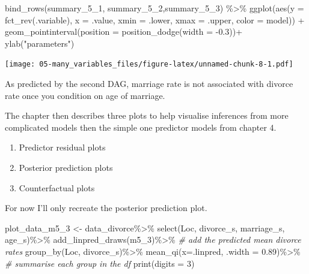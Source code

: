 \documentclass[
]{book}
\newenvironment{Shaded}{\begin{snugshade}}{\end{snugshade}}
\newcommand{\AttributeTok}[1]{\textcolor[rgb]{0.77,0.63,0.00}{#1}}
\newcommand{\CommentTok}[1]{\textcolor[rgb]{0.56,0.35,0.01}{\textit{#1}}}
\newcommand{\DecValTok}[1]{\textcolor[rgb]{0.00,0.00,0.81}{#1}}
\newcommand{\FloatTok}[1]{\textcolor[rgb]{0.00,0.00,0.81}{#1}}
\newcommand{\FunctionTok}[1]{\textcolor[rgb]{0.00,0.00,0.00}{#1}}
\newcommand{\NormalTok}[1]{#1}
\newcommand{\OtherTok}[1]{\textcolor[rgb]{0.56,0.35,0.01}{#1}}
\newcommand{\SpecialCharTok}[1]{\textcolor[rgb]{0.00,0.00,0.00}{#1}}
\newcommand{\StringTok}[1]{\textcolor[rgb]{0.31,0.60,0.02}{#1}}
\providecommand{\tightlist}{%
  \setlength{\itemsep}{0pt}\setlength{\parskip}{0pt}}
\begin{document}
\begin{Shaded}
\begin{Highlighting}[]
\FunctionTok{bind\_rows}\NormalTok{(summary\_5\_1, summary\_5\_2,summary\_5\_3) }\SpecialCharTok{\%\textgreater{}\%}
  \FunctionTok{ggplot}\NormalTok{(}\FunctionTok{aes}\NormalTok{(}\AttributeTok{y =} \FunctionTok{fct\_rev}\NormalTok{(.variable), }\AttributeTok{x =}\NormalTok{ .value, }\AttributeTok{xmin =}\NormalTok{ .lower, }\AttributeTok{xmax =}\NormalTok{ .upper, }\AttributeTok{color =}\NormalTok{ model)) }\SpecialCharTok{+}
  \FunctionTok{geom\_pointinterval}\NormalTok{(}\AttributeTok{position =} \FunctionTok{position\_dodge}\NormalTok{(}\AttributeTok{width =} \SpecialCharTok{{-}}\FloatTok{0.3}\NormalTok{))}\SpecialCharTok{+}
  \FunctionTok{ylab}\NormalTok{(}\StringTok{"parameters"}\NormalTok{)}
\end{Highlighting}
\end{Shaded}

\texttt{[image: 05-many\_variables\_files/figure-latex/unnamed-chunk-8-1.pdf]}

As predicted by the second DAG, marriage rate is not associated with divorce rate once you condition on age of marriage.

The chapter then describes three plots to help visualise inferences from more complicated models then the simple one predictor models from chapter 4.

\begin{enumerate}
\def\labelenumi{(\arabic{enumi})}
\tightlist
\item
  Predictor residual plots
\item
  Posterior prediction plots
\item
  Counterfactual plots
\end{enumerate}

For now I'll only recreate the posterior prediction plot.

\begin{Shaded}
\begin{Highlighting}[]
\NormalTok{plot\_data\_m5\_3 }\OtherTok{\textless{}{-}}\NormalTok{ data\_divorce}\SpecialCharTok{\%\textgreater{}\%}
  \FunctionTok{select}\NormalTok{(Loc, divorce\_s, marriage\_s, age\_s)}\SpecialCharTok{\%\textgreater{}\%}
  \FunctionTok{add\_linpred\_draws}\NormalTok{(m5\_3)}\SpecialCharTok{\%\textgreater{}\%} \CommentTok{\# add the predicted mean divorce rates}
  \FunctionTok{group\_by}\NormalTok{(Loc, divorce\_s)}\SpecialCharTok{\%\textgreater{}\%}
  \FunctionTok{mean\_qi}\NormalTok{(}\AttributeTok{x=}\NormalTok{.linpred, }\AttributeTok{.width =} \FloatTok{0.89}\NormalTok{)}\SpecialCharTok{\%\textgreater{}\%} \CommentTok{\# summarise each group in the df }
  \FunctionTok{print}\NormalTok{(}\AttributeTok{digits =} \DecValTok{3}\NormalTok{)}
\end{Highlighting}
\end{Shaded}
\end{document}
